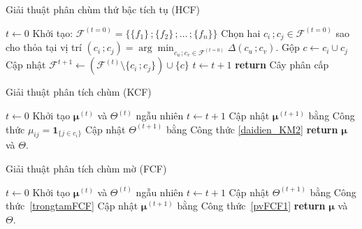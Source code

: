 \documentclass[a4paper,oneside]{book} %
\theoremstyle{plain}
\theoremstyle{plain}
\theoremstyle{nonumberplain}
\begin{document}
\begin{spacing}{1.0}
\begin{algorithm}
	\fontsize{11pt}{14pt}\selectfont
	\caption{Giải thuật phân chùm thứ bậc tích tụ (HCF)}\label{alg:HCF}
	\begin{algorithmic}[1]
		\State $t \gets 0$
		\State Khởi tạo: $\mathcal{F}^{(t=0)} = \{\{f_1\}\,;\{f_2\}\,;\ldots\,;\{f_n\}\}$
		\State Chọn hai $c_i\,; c_j \in \mathcal{F}^{(t=0)}$ sao cho thỏa tại vị trí $(c_i\,;c_j)=\arg\min_{c_u\,;c_v\in\mathcal{F}^{(t=0)}}\Delta(c_u\,;c_v).$
		\State Gộp $c \gets c_i \cup c_j$
		\State Cập nhật $\mathcal{F}^{t+1}\gets \left(\mathcal{F}^{(t)}\setminus\{c_i\,;c_j\}\right)\cup\{c\}$
		\State $t \gets t + 1$
		\EndWhile
		\State \textbf{return} Cây phân cấp
		\EndProcedure
	\end{algorithmic}
\end{algorithm}



\begin{algorithm}[H]
	\fontsize{11pt}{14pt}\selectfont
	\caption{Giải thuật phân tích chùm (KCF)}
	\label{alg:KCF}
	\begin{algorithmic}[1] %
		\State $t\gets0$
		\State Khởi tạo ${\bm\mu}^{(t)}$ và $\Theta^{(t)}$ ngẫu nhiên
		\State $t \gets t+1$
		\State Cập nhật ${\bm\mu}^{(t+1)}$ bằng Công thức  $\mu_{ij}= \bm 1_{\{j\in c_i\}}$
		\State Cập nhật $\Theta^{(t+1)}$ bằng Công thức \eqref{daidien_KM2}
		\EndWhile
		\State \textbf{return} ${\bm\mu}$ và $\Theta$.
		\EndProcedure
	\end{algorithmic}
\end{algorithm}



\begin{algorithm}[H]
	\fontsize{11pt}{14pt}\selectfont
	\caption{Giải thuật phân tích chùm mờ (FCF)}
	\label{alg:FCF}
	\begin{algorithmic}[1] %
		\State $t\gets0$
		\State Khởi tạo ${\bm\mu}^{(t)}$ và $\Theta^{(t)}$ ngẫu nhiên
		\State $t \gets t+1$
		\State Cập nhật $\Theta^{(t+1)}$ bằng Công thức~\eqref{trongtamFCF}
		\State Cập nhật ${\bm\mu}^{(t+1)}$ bằng Công thức~\eqref{pvFCF1}
		\EndWhile\label{euclidendwhile}
		\State \textbf{return} ${\bm\mu}$ và $\Theta$.
		\EndProcedure
	\end{algorithmic}
\end{algorithm}








\end{spacing}
\end{document}
